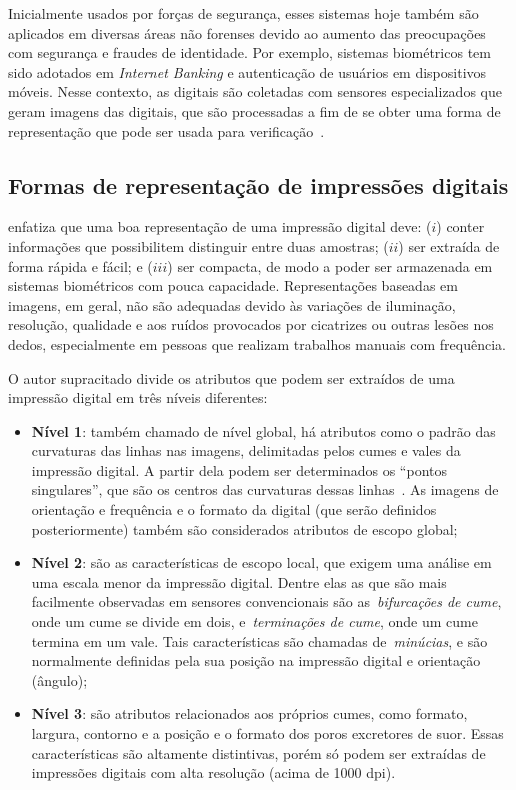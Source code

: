 Inicialmente usados por forças de segurança, esses sistemas hoje também são aplicados em diversas áreas não forenses devido ao aumento das preocupações com segurança e fraudes de identidade. Por exemplo, sistemas biométricos tem sido adotados em \textit{Internet Banking} e autenticação de usuários em dispositivos móveis. Nesse contexto, as digitais são coletadas com sensores especializados que geram imagens das digitais, que são processadas a fim de se obter uma forma de representação que pode ser usada para verificação~\cite{handbook_of_fp_recognition}.


\subsection{Formas de representação de impressões digitais}\label{subsec:representacao_de_digitais}

 enfatiza que uma boa representação de uma impressão digital deve: ($i$) conter informações que possibilitem distinguir entre duas amostras; ($ii$) ser extraída de forma rápida e fácil; e ($iii$) ser compacta, de modo a poder ser armazenada em sistemas biométricos com pouca capacidade. Representações baseadas em imagens, em geral, não são adequadas devido às variações de iluminação, resolução, qualidade e aos ruídos provocados por cicatrizes ou outras lesões nos dedos, especialmente em pessoas que realizam trabalhos manuais com frequência.

O autor supracitado divide os atributos que podem ser extraídos de uma impressão digital em três níveis diferentes:
\begin{itemize}
    \item \textbf{Nível 1}: também chamado de nível global, há atributos como o padrão das curvaturas das linhas nas imagens, delimitadas pelos cumes e vales da impressão digital. A partir dela podem ser determinados os ``pontos singulares'', que são os centros das curvaturas dessas linhas~\cite{LEVI1972327}. As imagens de orientação e frequência e o formato da digital (que serão definidos posteriormente) também são considerados atributos de escopo global;
    \item \textbf{Nível 2}: são as características de escopo local, que exigem uma análise em uma escala menor da impressão digital. Dentre elas as que são mais facilmente observadas em sensores convencionais são as~\textit{bifurcações de cume}, onde um cume se divide em dois, e~\textit{terminações de cume}, onde um cume termina em um vale. Tais características são chamadas de~\textit{minúcias}, e são normalmente definidas pela sua posição na impressão digital e orientação (ângulo);
    \item \textbf{Nível 3}: são atributos relacionados aos próprios cumes, como formato, largura, contorno e a posição e o formato dos poros excretores de suor. Essas características são altamente distintivas, porém só podem ser extraídas de impressões digitais com alta resolução (acima de 1000 dpi).    
\end{itemize}


